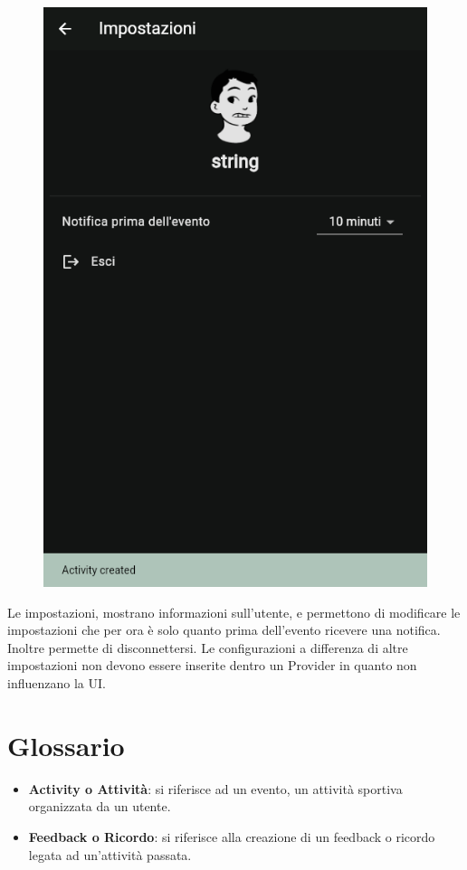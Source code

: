 \documentclass[a4paper,12pt]{article}
\begin{document}
\begin{figure}
    \vspace{-26pt}
    \center
    \includegraphics[width=0.5\linewidth]{img/settings.png}
\end{figure}
Le impostazioni, mostrano informazioni sull'utente, e permettono di modificare le impostazioni che per ora è solo quanto prima dell'evento ricevere una notifica. Inoltre permette di disconnettersi.
Le configurazioni a differenza di altre impostazioni non devono essere inserite dentro un Provider in quanto non influenzano la UI.

\newpage
\section{Glossario}


\begin{itemize}
    \item \label{gl:activity} \textbf{Activity o Attività}: si riferisce ad un evento, un attività sportiva organizzata da un utente.
    \item \label{gl:feedback} \textbf{Feedback o Ricordo}: si riferisce alla creazione di un feedback o ricordo legata ad un'attività passata.
\end{itemize}
\end{document}
